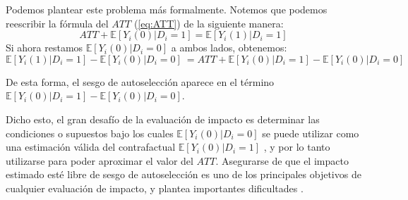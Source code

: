 \documentclass[../../main.tex]{subfiles}
\begin{document}
Podemos plantear este problema más formalmente. Notemos que podemos reescribir la fórmula del \(ATT\) (\ref{eq:ATT}) de la siguiente manera:
\begin{equation}
    ATT + \mathbb{E} \left[Y_i(0)|D_i=1\right] = \mathbb{E} \left[Y_i(1)|D_i=1\right] 
    \label{eq:ATT2}
\end{equation}
Si ahora restamos \(\mathbb{E} \left[Y_i(0)|D_i=0\right]\) a ambos lados, obtenemos:
\begin{equation}
    \mathbb{E} \left[Y_i(1)|D_i=1\right] - \mathbb{E} \left[Y_i(0)|D_i=0\right]\ = ATT + \mathbb{E} \left[Y_i(0)|D_i=1\right] - \mathbb{E} \left[Y_i(0)|D_i=0\right]\
    \label{eq:ATT3}
\end{equation}

De esta forma, el sesgo de autoselección aparece en el término \(\mathbb{E} \left[Y_i(0)|D_i=1\right] - \mathbb{E} \left[Y_i(0)|D_i=0\right]\).

Dicho esto, el gran desafío de la evaluación de impacto es determinar las condiciones o supuestos bajo los cuales \(\mathbb{E} \left[Y_i(0)|D_i=0\right]\) se puede utilizar como una estimación válida del contrafactual \(\mathbb{E} \left[Y_i(0)|D_i=1\right]\) \cite{bernal}, y por lo tanto utilizarse para poder aproximar el valor del \(ATT\). Asegurarse de que el impacto estimado esté libre de sesgo de autoselección es uno de los principales objetivos de cualquier evaluación
de impacto, y plantea importantes dificultades \cite{gertler-2016}. 

\end{document}
